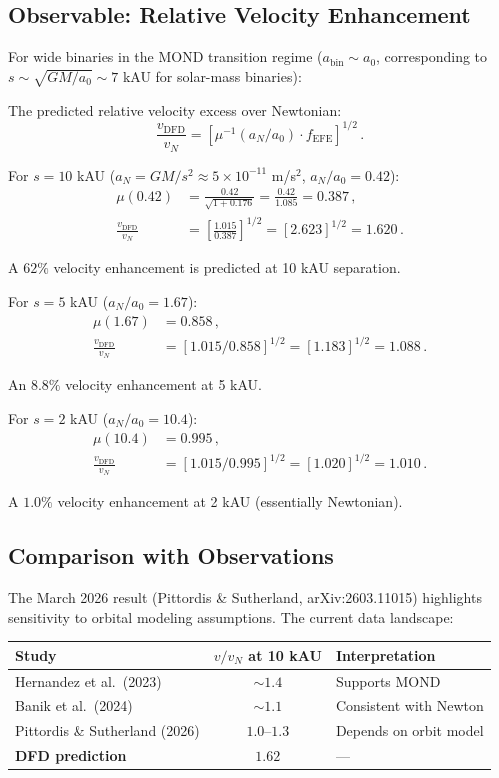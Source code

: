 \documentclass[11pt,a4paper]{article}
\begin{document}
\subsection{Observable: Relative Velocity Enhancement}

For wide binaries in the MOND transition regime ($a_{\mathrm{bin}} \sim a_0$, corresponding to $s \sim \sqrt{GM/a_0} \sim 7$ kAU for solar-mass binaries):

The predicted relative velocity excess over Newtonian:
\begin{equation}
\frac{v_{\mathrm{DFD}}}{v_N} = \left[\mu^{-1}(a_N/a_0) \cdot f_{\mathrm{EFE}}\right]^{1/2}\,.
\end{equation}

For $s = 10$ kAU ($a_N = GM/s^2 \approx 5 \times 10^{-11}$ m/s$^2$, $a_N/a_0 = 0.42$):
\begin{align}
\mu(0.42) &= \frac{0.42}{\sqrt{1+0.176}} = \frac{0.42}{1.085} = 0.387\,, \\
\frac{v_{\mathrm{DFD}}}{v_N} &= \left[\frac{1.015}{0.387}\right]^{1/2} = [2.623]^{1/2} = 1.620\,.
\end{align}

A $62\%$ velocity enhancement is predicted at 10 kAU separation.

For $s = 5$ kAU ($a_N/a_0 = 1.67$):
\begin{align}
\mu(1.67) &= 0.858\,, \\
\frac{v_{\mathrm{DFD}}}{v_N} &= [1.015/0.858]^{1/2} = [1.183]^{1/2} = 1.088\,.
\end{align}

An $8.8\%$ velocity enhancement at 5 kAU.

For $s = 2$ kAU ($a_N/a_0 = 10.4$):
\begin{align}
\mu(10.4) &= 0.995\,, \\
\frac{v_{\mathrm{DFD}}}{v_N} &= [1.015/0.995]^{1/2} = [1.020]^{1/2} = 1.010\,.
\end{align}

A $1.0\%$ velocity enhancement at 2 kAU (essentially Newtonian).

\subsection{Comparison with Observations}

The March 2026 result (Pittordis \& Sutherland, arXiv:2603.11015) highlights sensitivity to orbital modeling assumptions. The current data landscape:

\begin{center}
\begin{tabular}{lcl}
\toprule
\textbf{Study} & $v/v_N$ at 10 kAU & \textbf{Interpretation} \\
\midrule
Hernandez et al.\ (2023) & $\sim 1.4$ & Supports MOND \\
Banik et al.\ (2024) & $\sim 1.1$ & Consistent with Newton \\
Pittordis \& Sutherland (2026) & $1.0$--$1.3$ & Depends on orbit model \\
\textbf{DFD prediction} & $\mathbf{1.62}$ & --- \\
\bottomrule
\end{tabular}
\end{center}
\end{document}
